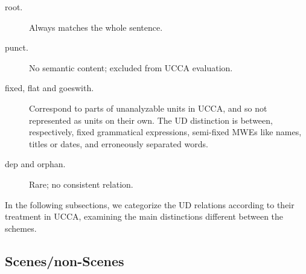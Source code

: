 \documentclass[11pt,a4paper]{article}
\begin{document}
\begin{description}
  \item[root.] Always matches the whole sentence.
  \item[punct.] No semantic content; excluded from UCCA evaluation.
  \item[fixed, flat and goeswith.] Correspond to parts of unanalyzable units in UCCA,
  and so not represented as units on their own.
  The UD distinction is between, respectively, fixed grammatical expressions,
  semi-fixed MWEs like names, titles or dates, and erroneously separated words.
  \item[dep and orphan.] Rare; no consistent relation.
\end{description}

In the following subsections, we categorize the UD relations according to their
treatment in UCCA, examining the main distinctions different between the schemes.

\subsection{Scenes/non-Scenes}\label{sec:scenes}
\end{document}
